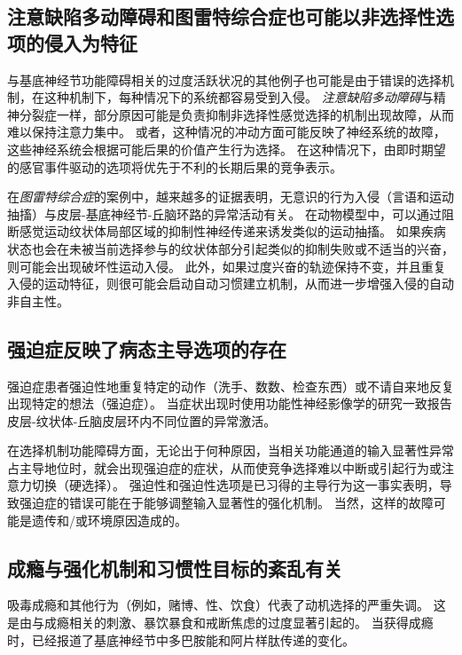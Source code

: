 \subsection{注意缺陷多动障碍和图雷特综合症也可能以非选择性选项的侵入为特征}

与基底神经节功能障碍相关的过度活跃状况的其他例子也可能是由于错误的选择机制，在这种机制下，每种情况下的系统都容易受到入侵。
\textit{注意缺陷多动障碍}与精神分裂症一样，部分原因可能是负责抑制非选择性感觉选择的机制出现故障，从而难以保持注意力集中。
或者，这种情况的冲动方面可能反映了神经系统的故障，这些神经系统会根据可能后果的价值产生行为选择。
在这种情况下，由即时期望的感官事件驱动的选项将优先于不利的长期后果的竞争表示。


在\textit{图雷特综合症}的案例中，越来越多的证据表明，无意识的行为入侵（言语和运动抽搐）与皮层-基底神经节-丘脑环路的异常活动有关。
在动物模型中，可以通过阻断感觉运动纹状体局部区域的抑制性神经传递来诱发类似的运动抽搐。
如果疾病状态也会在未被当前选择参与的纹状体部分引起类似的抑制失败或不适当的兴奋，则可能会出现破坏性运动入侵。
此外，如果过度兴奋的轨迹保持不变，并且重复入侵的运动特征，则很可能会启动自动习惯建立机制，从而进一步增强入侵的自动非自主性。



\subsection{强迫症反映了病态主导选项的存在}

强迫症患者强迫性地重复特定的动作（洗手、数数、检查东西）或不请自来地反复出现特定的想法（强迫症）。
当症状出现时使用功能性神经影像学的研究一致报告皮层-纹状体-丘脑皮层环内不同位置的异常激活。


在选择机制功能障碍方面，无论出于何种原因，当相关功能通道的输入显著性异常占主导地位时，就会出现强迫症的症状，从而使竞争选择难以中断或引起行为或注意力切换（硬选择）。
强迫性和强迫性选项是已习得的主导行为这一事实表明，导致强迫症的错误可能在于能够调整输入显著性的强化机制。
当然，这样的故障可能是遗传和/或环境原因造成的。



\subsection{成瘾与强化机制和习惯性目标的紊乱有关}

吸毒成瘾和其他行为（例如，赌博、性、饮食）代表了动机选择的严重失调。
这是由与成瘾相关的刺激、暴饮暴食和戒断焦虑的过度显著引起的。
当获得成瘾时，已经报道了基底神经节中多巴胺能和阿片样肽传递的变化。


